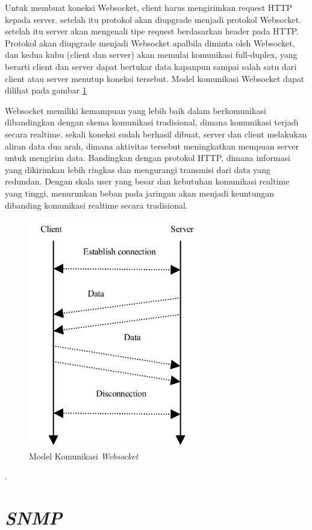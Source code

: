            	Untuk membuat koneksi Websocket, client harus mengirimkan request HTTP kepada server. setelah itu protokol akan diupgrade menjadi protokol Websocket. setelah itu server akan mengenali tipe request berdasarkan header pada HTTP. Protokol akan diupgrade menjadi Websocket apalbila diminta oleh Websocket, dan kedua kubu (client dan server) akan memulai komunikasi full-duplex, yang berarti client dan server dapat bertukar data kapanpun sampai salah satu dari client atau server menutup koneksi tersebut. Model komunikasi Websocket dapat dilihat pada gambar \ref{websocketmodel}
           		
           	Websocket memiliki kemampuan yang lebih baik dalam berkomunikasi dibandingkan dengan skema komunikasi tradisional, dimana komunikasi terjadi secara realtime. sekali koneksi sudah berhasil dibuat, server dan client melakukan aliran data dua arah, dimana aktivitas tersebut meningkatkan mempuan server untuk mengirim data. Bandingkan dengan protokol HTTP, dimana informasi yang dikirimkan lebih ringkas dan mengurangi transmisi dari data yang redundan. Dengan skala user yang besar dan kebutuhan komunikasi realtime yang tinggi, menurunkan beban pada jaringan akan menjadi keuntungan dibanding komunikasi realtime secara tradisional.
           	\begin{figure}[H]
           		\centering
           		\includegraphics[height=10cm]{Images/C-2/websocket.png}
           		\caption{Model Komunikasi \textit{Websocket}}
           		\label{websocketmodel}
           	\end{figure}
           	\cite{boettiger_introduction_2015}.
		\section{\textit{SNMP}}